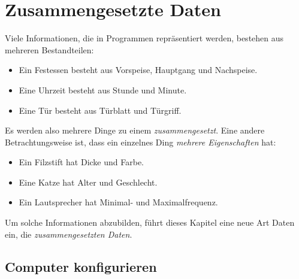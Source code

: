 
\chapter{Zusammengesetzte Daten}
\label{cha:zusammengesetzte-daten}

Viele Informationen, die in Programmen repräsentiert werden, bestehen
aus mehreren Bestandteilen:
%
\begin{itemize}
\item Ein Festessen besteht aus Vorspeise, Hauptgang und Nachspeise.
\item Eine Uhrzeit besteht aus Stunde und Minute.
\item Eine Tür besteht aus Türblatt und Türgriff.
\end{itemize}
%
Es werden also mehrere Dinge zu einem \textit{zusammengesetzt}.
Eine andere Betrachtungsweise ist, dass ein einzelnes
Ding \textit{mehrere Eigenschaften} hat:
%
\begin{itemize}
\item Ein Filzstift hat Dicke und Farbe.
\item Eine Katze hat Alter und Geschlecht.
\item Ein Lautsprecher hat Minimal- und Maximalfrequenz.
\end{itemize}
%
Um solche Informationen abzubilden, führt dieses Kapitel eine neue Art
Daten ein, die \textit{zusammengesetzten
  Daten}.

\section{Computer konfigurieren}
\label{sec:computer-konfigurieren}

